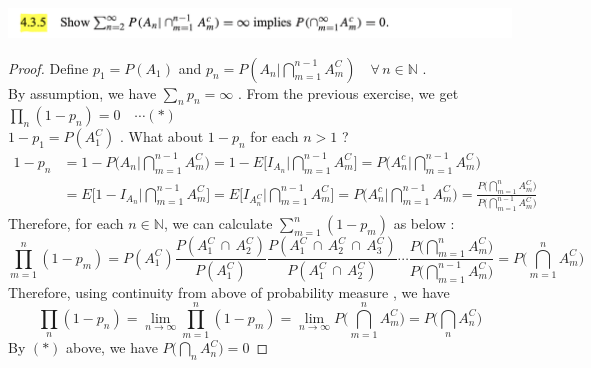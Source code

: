 \documentclass[12pt, A4]{article}
\newcommand{\N}{\mathbb{N}}
\newcommand{\intersect}{\,\cap\,}
\newcommand{\foranyn}{\quad \forall \, n\in \N}
\begin{document}
\includegraphics[width=17cm]{Exer4.3.5.png}
\begin{proof}
    Define $p_1=P(A_1)$ and $p_n=P(A_n|\bigcap_{m=1}^{n-1}A_m^C)\foranyn$ . \\By assumption, we have $\sum_n p_n=\infty$ . From the previous exercise, we get $\prod_n (1-p_n)=0\quad\cdots (*)$\\ $1-p_1=P(A_1^C)$ . What about $1-p_n$ for each $n>1$ ?
    \begin{align*}
        1-p_n &=1-P\Big(A_n\big|\bigcap_{m=1}^{n-1}A_m^C\Big) = 1- E\Big[I_{A_n}\big |\bigcap_{m=1}^{n-1}A_m^C \Big] =P(A_n^c \big | \bigcap_{m=1}^{n-1}A_m^C\Big) \\
        &= E\Big[1-I_{A_n} \big| \bigcap_{m=1}^{n-1}A_m^C \Big] = E\Big[I_{A_n^C}\big| \bigcap_{m=1}^{n-1}A_m^C\Big]=P\Big(A_n^c \big | \bigcap_{m=1}^{n-1}A_m^C\Big) =\frac{P\Big(\bigcap_{m=1}^{n}A_m^C\Big)}{P\Big(\bigcap_{m=1}^{n-1}A_m^C\Big)}
    \end{align*}
    Therefore, for each $n\in \N$, we can calculate $\sum_{m=1}^n (1-p_m)$ as below :
    $$\prod_{m=1}^n (1-p_m)=P(A_1^C)\frac{P(A_1^C\intersect A_2^C)}{P(A_1^C)}\frac{P(A_1^C\intersect A_2^C \intersect A_3^C)}{P(A_1^C\intersect A_2^C)}\cdots \frac{P\big(\bigcap_{m=1}^{n}A_m^C\big)}{P\big(\bigcap_{m=1}^{n-1}A_m^C\big)}=P\big(\bigcap_{m=1}^{n}A_m^C\big) $$
    Therefore, using continuity from above of probability measure , we have
    $$\prod_n (1-p_n)=\lim_{n\rightarrow \infty}\prod_{m=1}^n (1-p_m)=\lim_{n\rightarrow \infty}P\big(\bigcap_{m=1}^{n}A_m^C\big)=P\big(\bigcap_n A_n^C\big) $$  
    By $(*)$ above, we have $P\big(\bigcap_n A_n^C\big)=0$
\end{proof}
\vspace{1cm}
\end{document}
